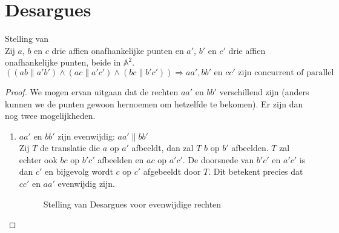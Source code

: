 \documentclass[main.tex]{subfiles}
\begin{document}
\section{Desargues}
\label{sec:desargues}

\begin{st}
  Stelling van \\
  Zij $a$, $b$ en $c$ drie affien onafhankelijke punten en $a'$, $b'$ en $c'$ drie affien onafhankelijke punten, beide in $\mathbb{A}^{2}$.
  \[  ((ab \parallel a'b') \wedge (ac \parallel a'c') \wedge (bc \parallel b'c')) \Rightarrow aa', bb' \text{ en } cc' \text{ zijn concurrent of parallel }\]
  
  \begin{proof}
    We mogen ervan uitgaan dat de rechten $aa'$ en $bb'$ verschillend zijn (anders kunnen we de punten gewoon hernoemen om hetzelfde te bekomen).
    Er zijn dan nog twee mogelijkheden.
    \begin{enumerate}
    \item $aa'$ en $bb'$ zijn evenwijdig: $aa' \parallel bb'$\\
      Zij $T$ de translatie die $a$ op $a'$ afbeeldt, dan zal $T$ $b$ op $b'$ afbeelden.
      $T$ zal echter ook $bc$ op $b'c'$ afbeelden en $ac$ op $a'c'$.
      De doorsnede van $b'c'$ en $a'c'$ is dan $c'$ en bijgevolg wordt $c$ op $c'$ afgebeeldt door $T$.
      Dit betekent precies dat $cc'$ en $aa'$ evenwijdig zijn.
      \begin{figure}[H]
        \centering
        \caption{Stelling van Desargues  voor evenwijdige rechten}
        \label{fig:stelling-van-desargues}
      \end{figure}


\end{enumerate}
\end{proof}
\end{st}
\end{document}
